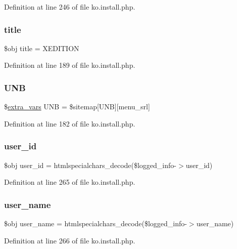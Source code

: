 Definition at line 246 of file ko.\+install.\+php.

\hypertarget{ko_8install_8php_a5b072c5fd1d2228c6ba5cee13cd142e3}{}\label{ko_8install_8php_a5b072c5fd1d2228c6ba5cee13cd142e3} 
\subsubsection{\texorpdfstring{title}{title}}
{\footnotesize\ttfamily \$obj title = \textquotesingle{}X\+E\+D\+I\+T\+I\+ON\textquotesingle{}}



Definition at line 189 of file ko.\+install.\+php.

\hypertarget{ko_8install_8php_abc0cb1f57d83d4a106f4495c30e0df52}{}\label{ko_8install_8php_abc0cb1f57d83d4a106f4495c30e0df52} 
\subsubsection{\texorpdfstring{U\+NB}{UNB}}
{\footnotesize\ttfamily \$\hyperlink{ko_8install_8php_ae1dcb37fc34a8f312d2e6abd6f806743}{extra\+\_\+vars} U\+NB = \$sitemap\mbox{[}\textquotesingle{}U\+NB\textquotesingle{}\mbox{]}\mbox{[}\textquotesingle{}menu\+\_\+srl\textquotesingle{}\mbox{]}}



Definition at line 182 of file ko.\+install.\+php.

\hypertarget{ko_8install_8php_a74f1a394389d774e5b4cd5d1d15413f7}{}\label{ko_8install_8php_a74f1a394389d774e5b4cd5d1d15413f7} 
\subsubsection{\texorpdfstring{user\+\_\+id}{user\_id}}
{\footnotesize\ttfamily \$obj user\+\_\+id = htmlspecialchars\+\_\+decode(\$logged\+\_\+info-\/$>$user\+\_\+id)}



Definition at line 265 of file ko.\+install.\+php.

\hypertarget{ko_8install_8php_a115401aff7da80e73c66e9f76505426b}{}\label{ko_8install_8php_a115401aff7da80e73c66e9f76505426b} 
\subsubsection{\texorpdfstring{user\+\_\+name}{user\_name}}
{\footnotesize\ttfamily \$obj user\+\_\+name = htmlspecialchars\+\_\+decode(\$logged\+\_\+info-\/$>$user\+\_\+name)}



Definition at line 266 of file ko.\+install.\+php.

